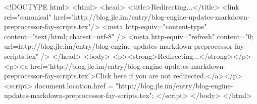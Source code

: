 <!DOCTYPE html>
<html>
<head>
<title>Redirecting...</title>
<link rel="canonical" href="http://blog.jle.im/entry/blog-engine-updates-markdown-preprocessor-fay-scripts.tex"/>
<meta http-equiv="content-type" content="text/html; charset=utf-8" />
<meta http-equiv="refresh" content="0; url=http://blog.jle.im/entry/blog-engine-updates-markdown-preprocessor-fay-scripts.tex" />
</head>
<body>
  <p><strong>Redirecting...</strong></p>
  <p><a href='http://blog.jle.im/entry/blog-engine-updates-markdown-preprocessor-fay-scripts.tex'>Click here if you are not redirected.</a></p>
  <script>
    document.location.href = "http://blog.jle.im/entry/blog-engine-updates-markdown-preprocessor-fay-scripts.tex";
  </script>
</body>
</html>
